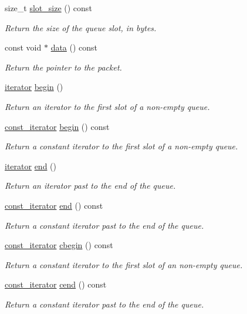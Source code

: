\begin{DoxyCompactItemize}
size\+\_\+t \hyperlink{classpfq_1_1queue_aa8ec2b1bd7c4fb2ec924f356c95b81ae}{slot\+\_\+size} () const 
\begin{DoxyCompactList}\small\item\em Return the size of the queue slot, in bytes. \end{DoxyCompactList}\item 
const void $\ast$ \hyperlink{classpfq_1_1queue_a62d08cb3627ed37a7f04aa58410ba8d7}{data} () const 
\begin{DoxyCompactList}\small\item\em Return the pointer to the packet. \end{DoxyCompactList}\item 
\hyperlink{structpfq_1_1queue_1_1iterator}{iterator} \hyperlink{classpfq_1_1queue_a107c15e5be3e53fc2dc7f8e25b3fba1e}{begin} ()
\begin{DoxyCompactList}\small\item\em Return an iterator to the first slot of a non-\/empty queue. \end{DoxyCompactList}\item 
\hyperlink{structpfq_1_1queue_1_1const__iterator}{const\+\_\+iterator} \hyperlink{classpfq_1_1queue_a9769ca50f14b7a5ca7196a2ec3608d44}{begin} () const 
\begin{DoxyCompactList}\small\item\em Return a constant iterator to the first slot of a non-\/empty queue. \end{DoxyCompactList}\item 
\hyperlink{structpfq_1_1queue_1_1iterator}{iterator} \hyperlink{classpfq_1_1queue_a1f2bcf8ef825d3c9d7761f2e4b4ed6dd}{end} ()
\begin{DoxyCompactList}\small\item\em Return an iterator past to the end of the queue. \end{DoxyCompactList}\item 
\hyperlink{structpfq_1_1queue_1_1const__iterator}{const\+\_\+iterator} \hyperlink{classpfq_1_1queue_a9cdca273d220e3eaa5ae1274d130174d}{end} () const 
\begin{DoxyCompactList}\small\item\em Return a constant iterator past to the end of the queue. \end{DoxyCompactList}\item 
\hyperlink{structpfq_1_1queue_1_1const__iterator}{const\+\_\+iterator} \hyperlink{classpfq_1_1queue_a4fc9d7f6a7a12116ef79bb648dc73527}{cbegin} () const 
\begin{DoxyCompactList}\small\item\em Return a constant iterator to the first slot of an non-\/empty queue. \end{DoxyCompactList}\item 
\hyperlink{structpfq_1_1queue_1_1const__iterator}{const\+\_\+iterator} \hyperlink{classpfq_1_1queue_add65cf417f0258d90f871b47a82e3eea}{cend} () const 
\begin{DoxyCompactList}\small\item\em Return a constant iterator past to the end of the queue. \end{DoxyCompactList}\end{DoxyCompactItemize}


